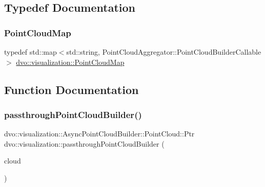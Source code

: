 \subsection{Typedef Documentation}
\mbox{\label{namespacedvo_1_1visualization_a6bfc209b639de1fc1fb54582af7292f7}} 
\subsubsection{\texorpdfstring{Point\+Cloud\+Map}{PointCloudMap}}
{\footnotesize\ttfamily typedef std\+::map$<$std\+::string, Point\+Cloud\+Aggregator\+::\+Point\+Cloud\+Builder\+Callable$>$ \mbox{\hyperlink{namespacedvo_1_1visualization_a6bfc209b639de1fc1fb54582af7292f7}{dvo\+::visualization\+::\+Point\+Cloud\+Map}}}



\subsection{Function Documentation}
\mbox{\label{namespacedvo_1_1visualization_a6bc29f6202a53878a0e89d1d50d1f20f}} 
\subsubsection{\texorpdfstring{passthrough\+Point\+Cloud\+Builder()}{passthroughPointCloudBuilder()}}
{\footnotesize\ttfamily dvo\+::visualization\+::\+Async\+Point\+Cloud\+Builder\+::\+Point\+Cloud\+::\+Ptr dvo\+::visualization\+::passthrough\+Point\+Cloud\+Builder (\begin{DoxyParamCaption}\item[{const dvo\+::visualization\+::\+Async\+Point\+Cloud\+Builder\+::\+Point\+Cloud\+::\+Ptr \&}]{cloud }\end{DoxyParamCaption})}

